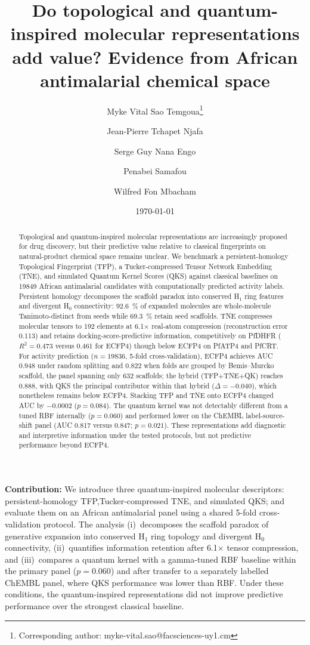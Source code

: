 \documentclass[11pt,a4paper]{article}
\title{\textbf{Do topological and quantum-inspired molecular representations add value? Evidence from African antimalarial chemical space}}
\author[1]{Myke Vital Sao Temgoua\thanks{Corresponding author: myke-vital.sao@facsciences-uy1.cm}}
\author[1]{Jean-Pierre Tchapet Njafa}
\author[1]{Serge Guy Nana Engo}
\author[2]{Penabei Samafou}
\author[3]{Wilfred Fon Mbacham}
\affil[1]{Department of Physics, Faculty of Science, University of Yaound\'e I, P.O. Box 812, Yaound\'e, Cameroon}
\affil[2]{Department of Medical Imaging and Radiation Sciences, Universit\'e de Sherbrooke, Sherbrooke, QC, Canada}
\affil[3]{Department of Biochemistry, Faculty of Science, University of Yaound\'e I, P.O. Box 812, Yaound\'e, Cameroon}
\date{\today}
\begin{document}
\maketitle


\begin{abstract}
Topological and quantum-inspired molecular representations are increasingly proposed for drug discovery, but their predictive value relative to classical fingerprints on natural-product chemical space remains unclear. We benchmark a persistent-homology Topological Fingerprint (TFP), a Tucker-compressed Tensor Network Embedding (TNE), and simulated Quantum Kernel Scores (QKS) against classical baselines on \num{19849} African antimalarial candidates with computationally predicted activity labels. Persistent homology decomposes the scaffold paradox into conserved H$_1$ ring features and divergent H$_0$ connectivity: \qty{92.6}{\percent} of expanded molecules are whole-molecule Tanimoto-distinct from seeds while \qty{69.3}{\percent} retain seed scaffolds. TNE compresses molecular tensors to \num{192} elements at \num{6.1}$\times$ real-atom compression (reconstruction error \num{0.113}) and retains docking-score-predictive information, competitively on PfDHFR ($R^2 = \num{0.473}$ versus \num{0.461} for ECFP4) though below ECFP4 on PfATP4 and PfCRT. For activity prediction ($n=\num{19836}$, 5-fold cross-validation), ECFP4 achieves AUC \num{0.948} under random splitting and \num{0.822} when folds are grouped by Bemis--Murcko scaffold, the panel spanning only \num{632} scaffolds; the hybrid (TFP+TNE+QK) reaches \num{0.888}, with QKS the principal contributor within that hybrid ($\Delta=-\num{0.040}$), which nonetheless remains below ECFP4. Stacking TFP and TNE onto ECFP4 changed AUC by \num{-0.0002} ($p=\num{0.084}$). The quantum kernel was not detectably different from a tuned RBF internally ($p=\num{0.060}$) and performed lower on the ChEMBL label-source-shift panel (AUC \num{0.817} versus \num{0.847}; $p=\num{0.021}$). These representations add diagnostic and interpretive information under the tested protocols, but not predictive performance beyond ECFP4.
\end{abstract}

\noindent\textbf{Contribution:} We introduce three quantum-inspired molecular descriptors: persistent-homology TFP,Tucker-compressed TNE, and simulated QKS; and evaluate them on an African antimalarial panel using a shared 5-fold cross-validation protocol. The analysis (i)~decomposes the scaffold paradox of generative expansion into conserved H$_1$ ring topology and divergent H$_0$ connectivity, (ii)~quantifies information retention after \num{6.1}$\times$ tensor compression, and (iii)~compares a quantum kernel with a gamma-tuned RBF baseline within the primary panel ($p = \num{0.060}$) and after transfer to a separately labelled ChEMBL panel, where QKS performance was lower than RBF. Under these conditions, the quantum-inspired representations did not improve predictive performance over the strongest classical baseline.
\end{document}
